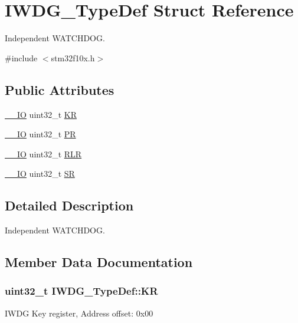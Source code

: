\hypertarget{struct_i_w_d_g___type_def}{\section{I\-W\-D\-G\-\_\-\-Type\-Def Struct Reference}
\label{struct_i_w_d_g___type_def}
}


Independent W\-A\-T\-C\-H\-D\-O\-G.  




{\ttfamily \#include $<$stm32f10x.\-h$>$}

\subsection*{Public Attributes}
\begin{DoxyCompactItemize}
\item 
\hyperlink{group___c_m_s_i_s__core__definitions_gaec43007d9998a0a0e01faede4133d6be}{\-\_\-\-\_\-\-I\-O} uint32\-\_\-t \hyperlink{struct_i_w_d_g___type_def_a63089aaa5f4ad34ee2677ebcdee49cd9}{K\-R}
\item 
\hyperlink{group___c_m_s_i_s__core__definitions_gaec43007d9998a0a0e01faede4133d6be}{\-\_\-\-\_\-\-I\-O} uint32\-\_\-t \hyperlink{struct_i_w_d_g___type_def_a5f2717885ff171e686e0347af9e6b68d}{P\-R}
\item 
\hyperlink{group___c_m_s_i_s__core__definitions_gaec43007d9998a0a0e01faede4133d6be}{\-\_\-\-\_\-\-I\-O} uint32\-\_\-t \hyperlink{struct_i_w_d_g___type_def_aa3703eaa40e447dcacc69c0827595532}{R\-L\-R}
\item 
\hyperlink{group___c_m_s_i_s__core__definitions_gaec43007d9998a0a0e01faede4133d6be}{\-\_\-\-\_\-\-I\-O} uint32\-\_\-t \hyperlink{struct_i_w_d_g___type_def_a9bbfbe921f2acfaf58251849bd0a511c}{S\-R}
\end{DoxyCompactItemize}


\subsection{Detailed Description}
Independent W\-A\-T\-C\-H\-D\-O\-G. 

\subsection{Member Data Documentation}
\hypertarget{struct_i_w_d_g___type_def_a63089aaa5f4ad34ee2677ebcdee49cd9}{
\subsubsection[{K\-R}]{ uint32\-\_\-t I\-W\-D\-G\-\_\-\-Type\-Def\-::\-K\-R}}\label{struct_i_w_d_g___type_def_a63089aaa5f4ad34ee2677ebcdee49cd9}
I\-W\-D\-G Key register, Address offset\-: 0x00

